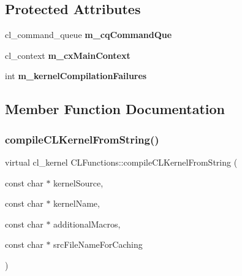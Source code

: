 \subsection*{Protected Attributes}
\begin{DoxyCompactItemize}
\item 
\mbox{\label{classCLFunctions_a0c1f36d128cf3cd2a7a66e8b7d08ef20}} 
cl\+\_\+command\+\_\+queue {\bfseries m\+\_\+cq\+Command\+Que}
\item 
\mbox{\label{classCLFunctions_a5d82d7f0672c561bc8d0f24200d7683c}} 
cl\+\_\+context {\bfseries m\+\_\+cx\+Main\+Context}
\item 
\mbox{\label{classCLFunctions_a9d3ea5032011c2cd587820b4600e54e9}} 
int {\bfseries m\+\_\+kernel\+Compilation\+Failures}
\end{DoxyCompactItemize}


\subsection{Member Function Documentation}
\mbox{\label{classCLFunctions_a0cdf897c3d96b4c029c663fc64cd7ffb}} 
\subsubsection{\texorpdfstring{compile\+C\+L\+Kernel\+From\+String()}{compileCLKernelFromString()}\hspace{0.1cm}{\footnotesize\ttfamily [1/2]}}
{\footnotesize\ttfamily virtual cl\+\_\+kernel C\+L\+Functions\+::compile\+C\+L\+Kernel\+From\+String (\begin{DoxyParamCaption}\item[{const char $\ast$}]{kernel\+Source,  }\item[{const char $\ast$}]{kernel\+Name,  }\item[{const char $\ast$}]{additional\+Macros,  }\item[{const char $\ast$}]{src\+File\+Name\+For\+Caching }\end{DoxyParamCaption})\hspace{0.3cm}{\ttfamily [virtual]}}

